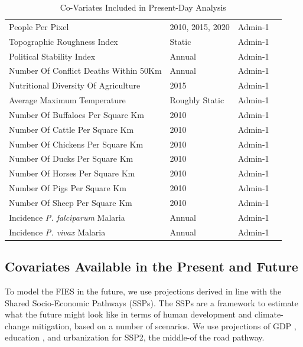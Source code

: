\documentclass{article}
\begin{document}
\begin{table}[H]
\begin{tabular}{llll}
		People Per Pixel & 2010, 2015, 2020 & Admin-1 & \cite{Doxsey-Whitfield2015} \\
		Topographic Roughness Index & Static & Admin-1 & \cite{USGS1996, Riley1999} \\
		Political Stability Index & Annual & Admin-1 & \cite{Kaufmann2011} \\
		Number Of Conflict Deaths Within 50Km & Annual & Admin-1 & \cite{Eriksson2015} \\
		Nutritional Diversity Of Agriculture & 2015 & Admin-1 & \cite{Herrero2017a} \\
		Average Maximum Temperature & Roughly Static & Admin-1 & \cite{Sheffield2006} \\
		Number Of Buffaloes Per Square Km & 2010 & Admin-1 & \cite{Robinson2014} \\
		Number Of Cattle Per Square Km & 2010 & Admin-1 & \cite{Robinson2014} \\
		Number Of Chickens Per Square Km & 2010 & Admin-1 & \cite{Robinson2014} \\
		Number Of Ducks Per Square Km & 2010 & Admin-1 & \cite{Robinson2014} \\
		Number Of Horses Per Square Km & 2010 & Admin-1 & \cite{Robinson2014} \\
		Number Of Pigs Per Square Km & 2010 & Admin-1 & \cite{Robinson2014} \\
		Number Of Sheep Per Square Km & 2010 & Admin-1 & \cite{Robinson2014} \\
		Incidence \textit{P. falciparum} Malaria & Annual & Admin-1 & \cite{Weiss2019} \\
		Incidence \textit{P. vivax} Malaria & Annual & Admin-1 & \cite{Weiss2019} \\
		\bottomrule
	\end{tabular}
	\caption{Co-Variates Included in Present-Day Analysis}
	\label{tab:covars1}
\end{table}

\subsection{Covariates Available in the Present and Future}
To model the FIES in the future, we use projections derived in line with the Shared Socio-Economic Pathways (SSPs).  The SSPs are a framework to estimate what the future might look like in terms of human development and climate-change mitigation, based on a number of scenarios.  We use projections of GDP \cite{Dellink2017}, education \cite{KC2017}, and urbanization \cite{Jiang2017} for SSP2, the middle-of the road pathway.
\end{document}
